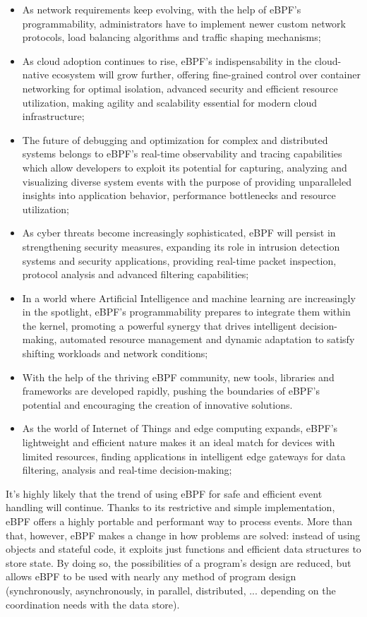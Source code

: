 \begin{itemize}
	\item As network requirements keep evolving, with the help of eBPF's 
		programmability, administrators have to implement newer custom network protocols, load balancing algorithms and traffic shaping mechanisms;
	\item As cloud adoption continues to rise, eBPF's indispensability in the
		cloud-native ecosystem will grow further, offering fine-grained control over container networking for optimal isolation, advanced security and efficient resource utilization, making agility and scalability essential for modern cloud infrastructure;
	\item The future of debugging and optimization for complex and distributed systems
		belongs to eBPF's real-time observability and tracing capabilities which allow developers to exploit its potential for capturing, analyzing and visualizing diverse system events with the purpose of providing unparalleled insights into application behavior, performance bottlenecks and resource utilization;
	\item As cyber threats become increasingly sophisticated, eBPF will persist in
		strengthening security measures, expanding its role in intrusion detection systems and security applications, providing real-time packet inspection, protocol analysis and advanced filtering capabilities;
	\item In a world where Artificial Intelligence and machine learning are
		increasingly in the spotlight, eBPF's programmability prepares to integrate them within the kernel, promoting a powerful synergy that drives intelligent decision-making, automated resource management and dynamic adaptation to satisfy shifting workloads and network conditions;
	\item With the help of the thriving eBPF community, new tools, libraries and
		frameworks are developed rapidly, pushing the boundaries of eBPF's potential and encouraging the creation of innovative solutions.
	\item As the world of Internet of Things and edge computing expands, eBPF's
		lightweight and efficient nature makes it an ideal match for devices with limited resources, finding applications in intelligent edge gateways for data filtering, analysis and real-time decision-making;
\end{itemize}

It’s highly likely that the trend of using eBPF for safe and efficient event handling will continue.
Thanks to its restrictive and simple implementation, eBPF offers a highly portable and performant way to process events. 
More than that, however, eBPF makes a change in how problems are solved: instead of using objects and stateful code, it exploits just functions and efficient data structures to store state. 
By doing so, the possibilities of a program’s design are reduced, but allows eBPF to be used with nearly any method of program design (synchronously, asynchronously, in parallel, distributed, ... depending on the coordination needs with the data store).

